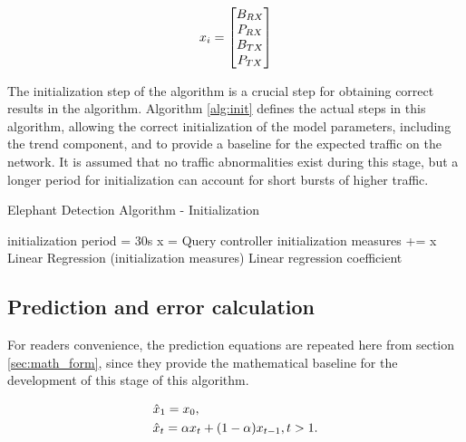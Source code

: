 \begin{equation}
    \centering
    x_i = 
    \begin{bmatrix}
    B_{RX}\\
    P_{RX}\\
    B_{TX}\\
    P_{TX}\\
    \end{bmatrix}
    \label{mat:port_stats}
\end {equation}

The initialization step of the algorithm is a crucial step for obtaining correct results in the algorithm. Algorithm \ref{alg:init} defines the actual steps in this
algorithm, allowing the correct initialization of the model parameters, including the trend component, and to provide a baseline for the expected traffic on the
network. It is assumed that no traffic abnormalities exist during this stage, but a longer period for initialization can account for short bursts of higher traffic.

\begin{algorithm}[H]
    \caption{Elephant Detection Algorithm - Initialization} \label{alg:init}
    \begin{algorithmic}[1]
            \State initialization period = 30s
                \State x = Query controller
                \State initialization measures += x
            \EndWhile
            \State Linear Regression (initialization measures)
        \State \Return Linear regression coefficient
    \end{algorithmic}
\end{algorithm}


\subsection{Prediction and error calculation}

For readers convenience, the prediction equations are repeated here from section \ref{sec:math_form}, since they provide the mathematical baseline for the development
of this stage of this algorithm.

\begin{equation}
    \centering
        \begin {split}
            &\hat{x}_1 = x_0, \\
            &\hat{x}_t = \alpha x_{t} + (1-\alpha)x_{t-1}, t > 1.
        \end {split}
    \label{eq:exp_smooth_rep}
\end{equation}

